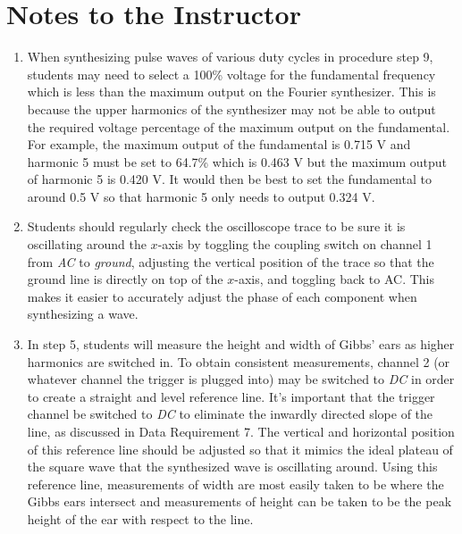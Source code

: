 \section{Notes to the Instructor}
\begin{enumerate}

\item When synthesizing pulse waves of various duty cycles in procedure step 9, students may need to select a 100\% voltage for the fundamental frequency which is less than the maximum output on the Fourier synthesizer. This is because the upper harmonics of the synthesizer may not be able to output the required voltage percentage of the maximum output on the fundamental. For example, the maximum output of the fundamental is 0.715 V and harmonic 5 must be set to 64.7\% which is 0.463 V but the maximum output of harmonic 5 is 0.420 V. It would then be best to set the fundamental to around 0.5 V so that harmonic 5 only needs to output 0.324 V.
\item Students should regularly check the oscilloscope trace to be sure it is oscillating around the $x$-axis by toggling the coupling switch on channel 1 from {\it AC} to {\it ground}, adjusting the vertical position of the trace so that the ground line is directly on top of the $x$-axis, and toggling back to AC. This makes it easier to accurately adjust the phase of each component when synthesizing a wave.
\item In step 5, students will measure the height and width of Gibbs' ears as higher harmonics are switched in. To obtain consistent measurements, channel 2 (or whatever channel the trigger is plugged into) may be switched to {\it DC} in order to create a straight and level reference line. It's important that the trigger channel be switched to {\it DC} to eliminate the inwardly directed slope of the line, as discussed in Data Requirement 7. The vertical and horizontal position of this reference line should be adjusted so that it mimics the ideal plateau of the square wave that the synthesized wave is oscillating around. Using this reference line, measurements of width are most easily taken to be where the Gibbs ears intersect and measurements of height can be taken to be the peak height of the ear with respect to the line. 

\end{enumerate}


